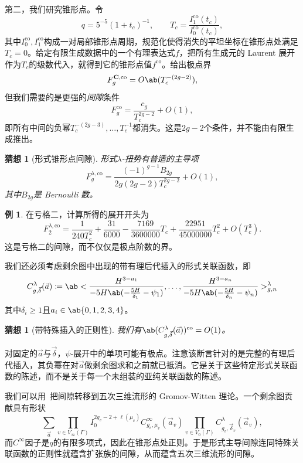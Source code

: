 \documentclass{amsart}
\newtheorem{conj}[thm]{猜想}
\theoremstyle{definition}
\newtheorem{exm}[thm]{例}
\theoremstyle{remark}
\theoremstyle{plain}
\theoremstyle{definition}
\theoremstyle{remark}
\newcommand{\mbf}[1]{\mathbf{#1}}
\newcommand{\mr}[1]{\mathrm{#1}}
\newcommand{\1}{\mathbf{1}}
\newcommand{\2}{\mathbf{2}}
\newcommand{\3}{\mathbf{3}}
\begin{document}
第二，我们研究锥形点。令
\[ q = 5^{-5}(1+t_c)^{-1}, \qquad T_c = \frac{I_1^{\mr{co}}(t_c)}{I_0^{\mr{co}}(t_c)}, \]
其中\(I_0^{\mr{co}}, I_1^{\mr{co}}\)构成一对局部锥形点周期，规范化使得消失的平坦坐标在锥形点处满足\(T_c = 0\)。给定有限生成数据中的一个有理表达式\(f\)，把所有生成元的 Laurent 展开作为\(T_c\)的级数代入，就得到它的锥形点值\(f^{\mr{co}}\)。给出极点界
\[ F_g^{\mbf{C},\mr{co}} = O\ab(T_c^{-(2g-2)}), \]
但我们需要的是更强的\textit{间隙}条件
\[ F_g^{\mr{co}} = \frac{c_g}{T_c^{2g-2}} + O(1), \]
即所有中间的负幂\(T_c^{-(2g-3)}, \ldots, T_c^{-1}\)都消失。这是\(2g-2\)个条件，并不能由有限生成推出。

\begin{conj}[形式锥形点间隙]%
\label{conj:formal conifold gap}
    形式\(\lambda\)-扭势有普适的主导项
    \[ F_g^{\lambda,\mr{co}} = \frac{(-1)^{g-1}B_{2g}}{2g(2g-2)T_c^{2g-2}} + O(1), \]
    其中\(B_{2g}\)是 Bernoulli 数。
\end{conj}

\begin{exm}
    在亏格二，计算所得的展开开头为
    \[ F_2^{\lambda,\mr{co}} = \frac{1}{240T_c^2} + \frac{31}{6000} - \frac{7169}{3600000}T_c + \frac{22951}{45000000}T_c^2 + O(T_c^3). \]
    这是亏格二的间隙，而不仅仅是极点阶数的界。
\end{exm}

我们还必须考虑剩余图中出现的带有理后代插入的形式关联函数，即
\[ C^{\lambda}_{g,\vec{\delta}}(\vec{a}) \coloneqq \ab< \frac{H^{3-a_1}}{-5H\ab(-\frac{5H}{\delta_1}-\psi_1)}, \ldots, \frac{H^{3-a_n}}{-5H\ab(-\frac{5H}{\delta_n}-\psi_n)}>^{\lambda}_{g,n} \]
其中\(\delta_i \geq 1\)且\(a_i \in \ab\{0,1,2,3,4\}\)。

\begin{conj}[带特殊插入的正则性]%
\label{conj:special correlator regularity}
    我们有\(\ab(C^{\lambda}_{g,\vec{\delta}}(\vec{a}))^{\mr{co}} = O(1)\)。
\end{conj}

对固定的\(\vec{a}\)与\(\vec{\delta}\)，\(\psi\)-展开中的单项可能有极点。注意该断言针对的是完整的有理后代插入，其负幂在对\(\vec{a}\)做剩余图求和之前就已抵消。它是关于这些特定形式关联函数的陈述，而不是关于每一个未组装的亚纯关联函数的陈述。

我们可以用~把间隙转移到五次三维流形的 Gromov-Witten 理论。一个剩余图贡献具有形状
\[ \sum_{\vec{a}} \prod_{v \in V_{\infty}(\Gamma)}I_0^{2g_v-2+\ell(\mu_v)}C^{\infty}_{g_v,\mu_v}(\vec{a}_v)\prod_{v\in V_0(\Gamma)}C^{\lambda}_{g_v,\vec{\delta}_v}(\vec{a}_v), \]
而\(C^{\infty}\)因子是\(q\)的有限多项式，因此在锥形点处正则。于是形式主导间隙连同特殊关联函数的正则性就蕴含扩张族的间隙，从而蕴含五次三维流形的间隙。
\end{document}
